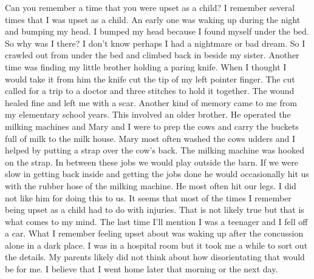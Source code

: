 Can you remember a time that you were upset as a child?
I remember several times that I was upset as a child. An early one was waking up during the night and bumping my head. I bumped my head because I found myself under the bed. So why was I there? I don't know perhaps I had a nightmare or bad dream. So I crawled out from under the bed and climbed back in beside my sister.
Another time was finding my little brother holding a paring knife. When I thought I would take it from him the knife cut the tip of my left pointer finger. The cut called for a trip to a doctor and three stitches to hold it together. The wound healed fine and left me with a scar.
Another kind of memory came to me from my elementary school years. This involved an older brother. He operated the milking machines and Mary and I were to prep the cows and carry the buckets full of milk to the milk house. Mary most often washed the cows udders and I helped by putting a strap over the cow's back. The milking machine was hooked on the strap. In between these jobs we would play outside the barn. If we were slow in getting back inside and getting the jobs done he would occasionally hit us with the rubber hose of the milking machine. He most often hit our legs. I did not like him for doing this to us.
It seems that most of the times I remember being upset as a child had to do with injuries. That is not likely true but that is what comes to my mind. The last time I'll mention I was a teenager and I fell off a car. What I remember feeling upset about was waking up after the concussion alone in a dark place. I was in a hospital room but it took me a while to sort out the details. My parents likely did not think about how disorientating that would be for me. I believe that I went home later that morning or the next day.






